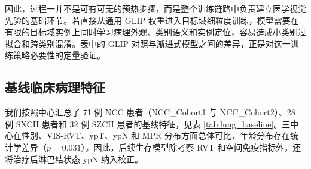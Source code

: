 因此，过程一并不是可有可无的预热步骤，而是整个训练链路中负责建立医学视觉先验的基础环节。若直接从通用 GLIP 权重进入目标域细粒度训练，模型需要在有限的目标域实例上同时学习病理外观、类别语义和实例定位，容易造成小类别过拟合和跨类别混淆。表中的 GLIP 对照与渐进式模型之间的差异，正是对这一训练策略必要性的定量验证。

\subsection{基线临床病理特征}
我们按照中心汇总了 71 例 NCC 患者（NCC\_Cohort1 与 NCC\_Cohort2）、28 例 SXCH 患者和 32 例 SZCH 患者的基线特征，见表 \ref{tab:lung_baseline}。三中心在性别、VIS-RVT、ypT、ypN 和 MPR 分布方面总体可比，年龄分布存在统计学差异（$p=0.031$）。因此，后续生存模型除考察 RVT 和空间免疫指标外，还将治疗后淋巴结状态 ypN 纳入校正。

